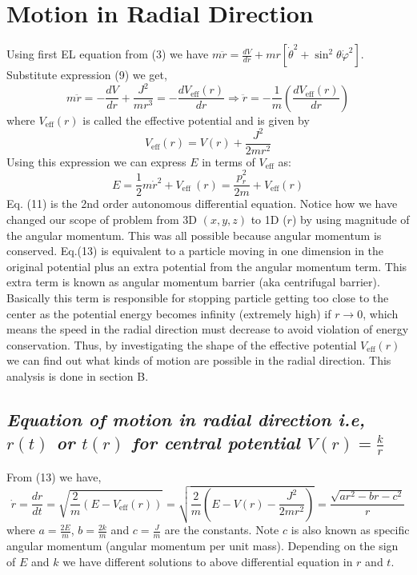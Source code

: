 \documentclass[conference]{IEEEtran}
\newcommand{\RomanNumeralCaps}[1]{\MakeUppercase{\romannumeral #1}}
\begin{document}
\section{\large{\textbf{Motion in Radial Direction}}}
 Using first EL equation from (3) we have $m\ddot{r} = \frac{dV}{d r} + mr\left[\dot{\theta}^{2}+\sin ^{2} \theta \dot{\varphi}^{2}\right]$. Substitute expression (9) we get, \begin{equation}m \ddot{r}= -\frac{d V}{d r}+\frac{J^{2}}{mr^{3}}  =  -\frac{d V_{\mathrm{eff}}(r)}{d r} \Rightarrow \ddot{r} = -\frac{1}{m}\left(\frac{d V_{\mathrm{eff}}(r)}{dr}\right)\end{equation} where $V_{\mathrm{eff}}(r)$ is called the effective potential and is given by \begin{equation}V_{\mathrm{eff}}(r)=V(r)+\frac{J^{2}}{2 m r^{2}}\end{equation}Using this expression we can express $E$ in terms of $V_{\mathrm{eff}}$ as: \begin{equation}
     E=\frac{1}{2} m \dot{r}^{2}+V_{\text {eff }}(r) = \frac{p_{r}^{2}}{2m} + V_{\mathrm{eff}}(r)
 \end{equation}
 Eq. (11) is the 2nd order autonomous differential equation. Notice how we have changed our scope of problem from 3D $(x,y,z)$ to 1D ($r$) by using magnitude of the angular momentum.  This was all possible because angular momentum is conserved. Eq.(13) is equivalent to a particle moving in one dimension in the original potential plus an extra potential from the angular momentum term. This extra term is known as angular momentum barrier (aka centrifugal barrier). Basically this term is responsible for stopping particle getting too close to the center as the potential energy becomes infinity (extremely high) if $r \to 0$, which means the speed in the radial direction must decrease to avoid violation of energy conservation. Thus, by investigating the shape of the effective potential $V_{\mathrm{eff}}(r)$ we can find out what kinds of motion are possible in the radial direction. This analysis is done in section \RomanNumeralCaps{4} B.
\vspace{1em}



\subsection{\normalsize{\emph{\textbf{Equation of motion in radial direction i.e, $r(t)$ or $t(r)$ for central potential $V(r) = \frac{k}{r}$}}}}
From (13) we have, \begin{dmath}\dot{r}=\frac{d r}{d t}= \sqrt{\frac{2}{m}\left(E-V_{\mathrm{eff}}(r)\right)}= \sqrt{\frac{2}{m}\left(E-V(r)-\frac{J^{2}}{2 m r^{2}}\right)} = \frac{\sqrt{ar^{2} - br - c^{2}}}{r}\end{dmath} where $a = \frac{2E}{m}$, $b = \frac{2k}{m}$ and $c = \frac{J}{m}$ are the constants. Note $c$ is also known as specific angular momentum (angular momentum per unit mass). Depending on the sign of $E$ and $k$ we have different solutions to above differential equation in $r$ and $t$. 
 \vspace{1em}
 
\end{document}
